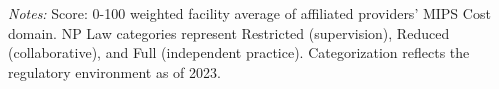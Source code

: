 \begin{table}[htbp]
    \centering
    \caption{Summary of Facility Avg: MIPS Cost by Authority and Year}
    \label{tab:fac_mips_cost_score}
    \vspace{0.2cm}
    \vspace{0.1cm}
    \begin{minipage}{\textwidth}
        \footnotesize \textit{Notes:} Score: 0-100 weighted facility average of affiliated providers' MIPS Cost domain. NP Law categories represent Restricted (supervision), Reduced (collaborative), and Full (independent practice). Categorization reflects the regulatory environment as of 2023.
    \end{minipage}
\end{table}